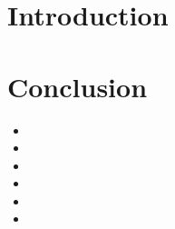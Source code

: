 


\biblio{}

\section*{Introduction}


\section{}
\subsection{}
\subsection{}
\section{}
\subsection{}
\subsection{}
\section{}
\subsection{}
\subsection{}



\section*{Conclusion}


\begin{remarques} \begin{itemize} 
\item 
\item 
\item 
\item 
\item 
\item 
\end{itemize} \end{remarques}